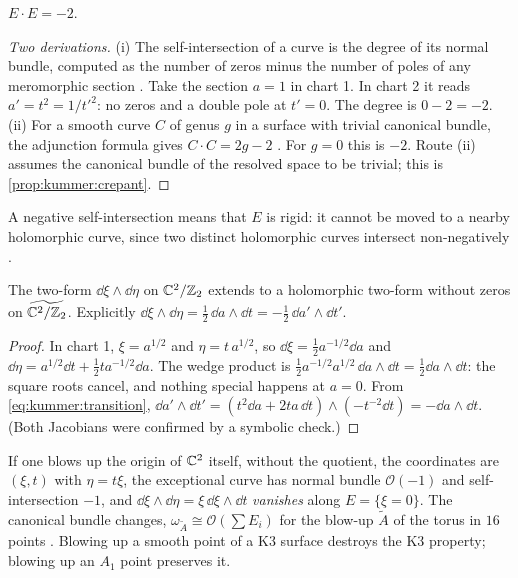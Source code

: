 \begin{proposition}\label{prop:kummer:minus2}
$E\cdot E=-2$.
\end{proposition}
\begin{proof}[Two derivations]
(i) The self-intersection of a curve is the degree of its normal bundle, computed as the
number of zeros minus the number of poles of any meromorphic section . Take the section $a=1$ in chart 1. In chart 2 it reads
$a'=t^2=1/t'^2$: no zeros and a double pole at $t'=0$. The degree is $0-2=-2$.
(ii) For a smooth curve $C$ of genus $g$ in a surface with trivial canonical bundle, the
adjunction formula gives $C\cdot C=2g-2$ . For
$g=0$ this is $-2$. Route (ii) assumes the canonical bundle of the resolved space to be
trivial; this is \cref{prop:kummer:crepant}.
\end{proof}

A negative self-intersection means that $E$ is rigid: it cannot be moved to a nearby
holomorphic curve, since two distinct holomorphic curves intersect non-negatively
.

\begin{proposition}\label{prop:kummer:crepant}
The two-form $\dd\xi\wedge\dd\eta$ on $\mathbb{C}^2/\mathbb{Z}_2$ extends to a holomorphic two-form without
zeros on $\widetilde{\mathbb{C}^2/\mathbb{Z}_2}$. Explicitly
$\dd\xi\wedge\dd\eta=\tfrac12\,\dd a\wedge\dd t=-\tfrac12\,\dd a'\wedge\dd t'$.
\end{proposition}
\begin{proof}
In chart 1, $\xi=a^{1/2}$ and $\eta=t\,a^{1/2}$, so
$\dd\xi=\frac12a^{-1/2}\dd a$ and $\dd\eta=a^{1/2}\dd t+\frac12ta^{-1/2}\dd a$. The wedge
product is $\frac12a^{-1/2}a^{1/2}\,\dd a\wedge\dd t=\frac12\dd a\wedge\dd t$: the square roots
cancel, and nothing special happens at $a=0$. From \eqref{eq:kummer:transition},
$\dd a'\wedge\dd t'=(t^2\dd a+2ta\,\dd t)\wedge(-t^{-2}\dd t)=-\dd a\wedge\dd t$. (Both Jacobians
were confirmed by a symbolic check.)
\end{proof}

\begin{pitfallbox}
If one blows up the origin of $\mathbb{C}^2$ itself, without the quotient, the coordinates are
$(\xi,t)$ with $\eta=t\xi$, the exceptional curve has normal bundle $\mathcal{O}(-1)$ and
self-intersection $-1$, and $\dd\xi\wedge\dd\eta=\xi\,\dd\xi\wedge\dd t$ \emph{vanishes} along
$E=\{\xi=0\}$. The canonical bundle changes, $\omega_{\tilde A}\cong\mathcal{O}(\sum E_i)$ for
the blow-up $\tilde A$ of the torus in $16$ points . Blowing
up a smooth point of a K3 surface destroys the K3 property; blowing up an $A_1$ point
preserves it.
\end{pitfallbox}

